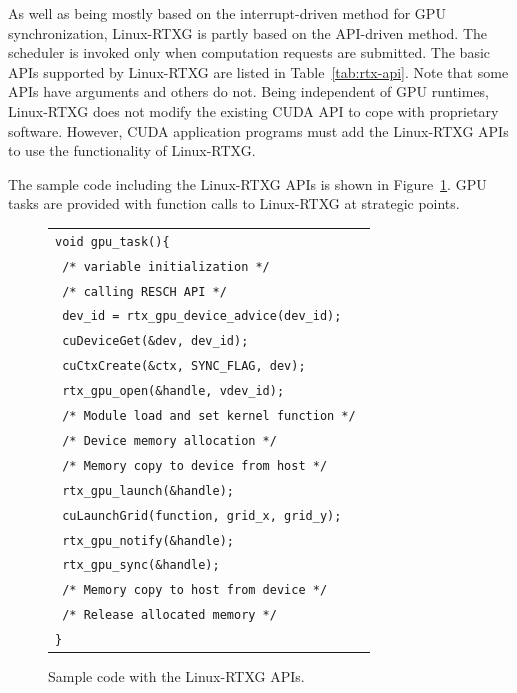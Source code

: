 As well as being mostly based on the interrupt-driven method for GPU synchronization, Linux-RTXG is partly based on the API-driven method.
The scheduler is invoked only when computation requests are submitted.
The basic APIs supported by Linux-RTXG are listed in Table~\ref{tab:rtx-api}.
Note that some APIs have arguments and others do not.
Being independent of GPU runtimes, Linux-RTXG does not modify the existing CUDA API to cope with proprietary software.
However, CUDA application programs must add the Linux-RTXG APIs to use the functionality of Linux-RTXG.


The sample code including the Linux-RTXG APIs is shown in Figure~\ref{fig:sample}.
GPU tasks are provided with function calls to Linux-RTXG at strategic points.

\begin{figure}[!t]
\begin{center}
\begin{tabular}{l}
\hline\hline
{\scriptsize \verb|void gpu_task(){        |}\\
{\scriptsize \verb| /* variable initialization */ |}\\
{\scriptsize \verb| /* calling RESCH API */ |}\\
{\scriptsize \verb| dev_id = rtx_gpu_device_advice(dev_id); |}\\
{\scriptsize \verb| cuDeviceGet(&dev, dev_id); |}\\
{\scriptsize \verb| cuCtxCreate(&ctx, SYNC_FLAG, dev); |}\\
{\scriptsize \verb| rtx_gpu_open(&handle, vdev_id); |}\\
{\scriptsize \verb| /* Module load and set kernel function */ |}\\
{\scriptsize \verb| /* Device memory allocation */ |}\\
{\scriptsize \verb| /* Memory copy to device from host */ |}\\
{\scriptsize \verb| rtx_gpu_launch(&handle); |}\\
{\scriptsize \verb| cuLaunchGrid(function, grid_x, grid_y); |}\\
{\scriptsize \verb| rtx_gpu_notify(&handle); |}\\
{\scriptsize \verb| rtx_gpu_sync(&handle); |}\\
{\scriptsize \verb| /* Memory copy to host from device */ |}\\
{\scriptsize \verb| /* Release allocated memory */ |}\\
{\scriptsize \verb|}|}\\
\hline\hline
\end{tabular}
\caption{Sample code with the Linux-RTXG APIs.}
\vspace{-2mm}
\label{fig:sample}
\end{center}
\end{figure}

